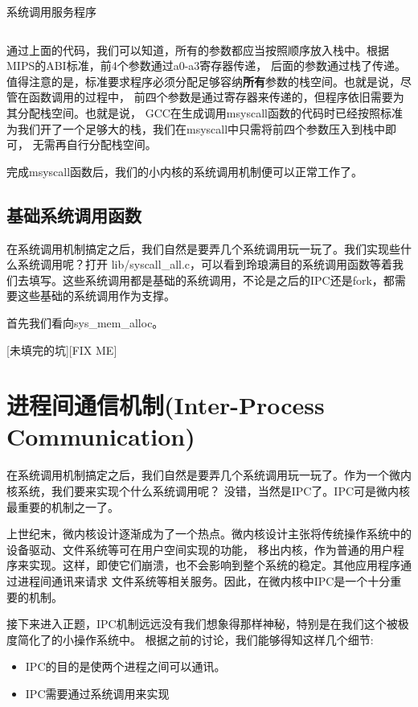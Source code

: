 \begin{codeBoxWithCaption}{系统调用服务程序\label{code:handlesys.S}}
  \inputminted[linenos]{gas}{codes/handlesys.S}
\end{codeBoxWithCaption}

通过上面的代码，我们可以知道，所有的参数都应当按照顺序放入栈中。根据MIPS的ABI标准，前4个参数通过a0-a3寄存器传递，
后面的参数通过栈了传递。值得注意的是，标准要求程序必须分配足够容纳\textbf{所有}参数的栈空间。也就是说，尽管在函数调用的过程中，
前四个参数是通过寄存器来传递的，但程序依旧需要为其分配栈空间。也就是说，
GCC在生成调用msyscall函数的代码时已经按照标准为我们开了一个足够大的栈，我们在msyscall中只需将前四个参数压入到栈中即可，
无需再自行分配栈空间。

完成msyscall函数后，我们的小内核的系统调用机制便可以正常工作了。

\subsection{基础系统调用函数}

在系统调用机制搞定之后，我们自然是要弄几个系统调用玩一玩了。我们实现些什么系统调用呢？打开 lib/syscall\_all.c，可以看到玲琅满目的系统调用函数等着我们去填写。这些系统调用都是基础的系统调用，不论是之后的IPC还是fork，都需要这些基础的系统调用作为支撑。

首先我们看向sys\_mem\_alloc。

[未填完的坑][FIX ME]

\section{进程间通信机制(Inter-Process Communication)}
在系统调用机制搞定之后，我们自然是要弄几个系统调用玩一玩了。作为一个微内核系统，我们要来实现个什么系统调用呢？
没错，当然是IPC了。IPC可是微内核最重要的机制之一了。

\begin{note}
上世纪末，微内核设计逐渐成为了一个热点。微内核设计主张将传统操作系统中的设备驱动、文件系统等可在用户空间实现的功能，
移出内核，作为普通的用户程序来实现。这样，即使它们崩溃，也不会影响到整个系统的稳定。其他应用程序通过进程间通讯来请求
文件系统等相关服务。因此，在微内核中IPC是一个十分重要的机制。
\end{note}

接下来进入正题，IPC机制远远没有我们想象得那样神秘，特别是在我们这个被极度简化了的小操作系统中。
根据之前的讨论，我们能够得知这样几个细节:

\begin{itemize}
  \item IPC的目的是使两个进程之间可以通讯。
  \item IPC需要通过系统调用来实现
\end{itemize}

